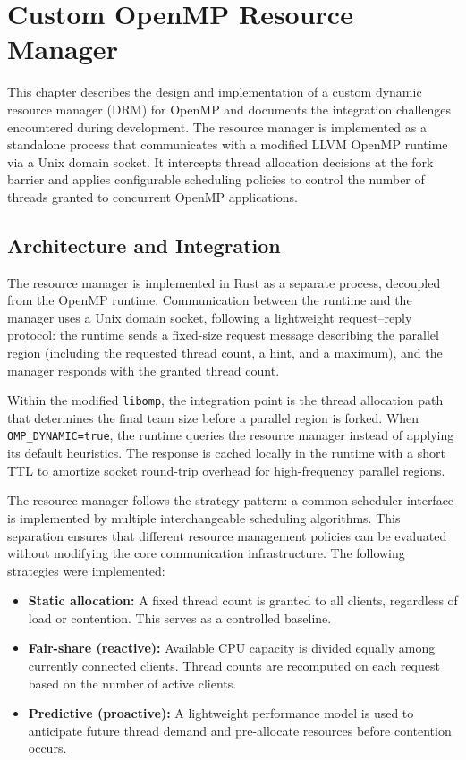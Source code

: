 
\chapter{Custom OpenMP Resource Manager}\label{chapter:custom_rm}

This chapter describes the design and implementation of a custom dynamic resource manager (DRM) for OpenMP and documents the integration challenges encountered during development. The resource manager is implemented as a standalone process that communicates with a modified LLVM OpenMP runtime via a Unix domain socket. It intercepts thread allocation decisions at the fork barrier and applies configurable scheduling policies to control the number of threads granted to concurrent OpenMP applications.

\section{Architecture and Integration}

The resource manager is implemented in Rust as a separate process, decoupled from the OpenMP runtime. Communication between the runtime and the manager uses a Unix domain socket, following a lightweight request--reply protocol: the runtime sends a fixed-size request message describing the parallel region (including the requested thread count, a hint, and a maximum), and the manager responds with the granted thread count.

Within the modified \texttt{libomp}, the integration point is the thread allocation path that determines the final team size before a parallel region is forked. When \texttt{OMP\_DYNAMIC=true}, the runtime queries the resource manager instead of applying its default heuristics. The response is cached locally in the runtime with a short TTL to amortize socket round-trip overhead for high-frequency parallel regions.

The resource manager follows the strategy pattern: a common scheduler interface is implemented by multiple interchangeable scheduling algorithms. This separation ensures that different resource management policies can be evaluated without modifying the core communication infrastructure. The following strategies were implemented:

\begin{itemize}
  \item \textbf{Static allocation:} A fixed thread count is granted to all clients, regardless of load or contention. This serves as a controlled baseline.
  \item \textbf{Fair-share (reactive):} Available CPU capacity is divided equally among currently connected clients. Thread counts are recomputed on each request based on the number of active clients.
  \item \textbf{Predictive (proactive):} A lightweight performance model is used to anticipate future thread demand and pre-allocate resources before contention occurs.
\end{itemize}


